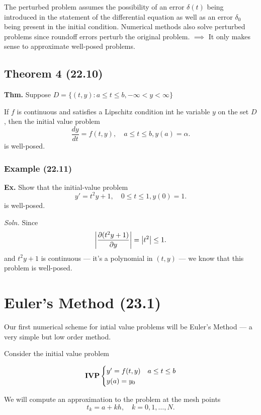 \documentclass[12pt]{article}
\newcommand{\thm}{\textbf{Thm.}\xspace}
\newcommand{\Ex}{\textbf{Ex.}\xspace}
\newcommand{\soln}{\textit{Soln.}\xspace}
\begin{document}
The perturbed problem assumes the possibility of an error $\delta(t)$ being
introduced in the statement of the differential equation as well as an error
$\delta_0$ being present in the initial condition. Numerical methods also solve
perturbed problems since roundoff errors perturb the original problem.
$\implies$ It only makes sense to approximate well-posed problems.

\subsection{Theorem 4 (22.10)}
\thm Suppose $D=\{(t,y): a\leq t \leq b, -\infty < y < \infty\}$ 

If $f$ is continuous and satisfies a Lipschitz condition int he variable $y$ on
the set $D$, then the initial value problem
\[
\frac{dy}{dt}=f(t,y), \quad a \leq t \leq b, y(a) = \alpha
.\]
is well-posed.

\subsubsection{Example (22.11)}
\Ex Show that the initial-value problem
\[
y' = t^2y+1 , \quad 0 \leq t \leq 1, y(0) = 1
.\]
is well-posed.

\soln Since
\[
  \abs{\frac{\partial(t^2y+1)}{\partial y}} = \abs{t^2} \leq 1
.\]
and $t^2y+1$ is continuous --- it's a polynomial in $(t,y)$ --- we know that
this problem is well-posed.

\section{Euler's Method (23.1)}

Our first numerical scheme for intial value problems will be Euler's Method ---
a very simple but low order method.

Consider the initial value problem

\[
  \text{\textbf{IVP}}\begin{cases}
y' = f(t,y) & a \leq t \leq b\\
y(a) = y_0 & 
\end{cases}
\]

We will compute an approximation to the problem at the mesh points
\[
t_k = a + kh, \quad k = 0, 1, \ldots, N
.\]
\end{document}
